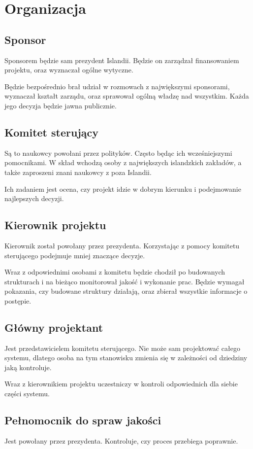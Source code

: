 \section{Organizacja} 
\subsection{Sponsor}
Sponsorem będzie sam prezydent Islandii.
Będzie on zarządzał finansowaniem projektu, oraz wyznaczał ogólne wytyczne.

Będzie bezpośrednio brał udział w rozmowach z największymi sponsorami, wyznaczał kształt zarządu, oraz sprawował ogólną władzę nad wszystkim.
Każda jego decyzja będzie jawna publicznie.

\subsection{Komitet sterujący}
Są to naukowcy powołani przez polityków. Często będąc ich wcześniejszymi pomocnikami.
W skład wchodzą osoby z największych islandzkich zakładów, a także zaproszeni znani naukowcy z poza Islandii.

Ich zadaniem jest ocena, czy projekt idzie w dobrym kierunku i podejmowanie najlepszych decyzji.

\subsection{Kierownik projektu}
Kierownik został powołany przez prezydenta.
Korzystając z pomocy komitetu sterującego podejmuje mniej znaczące decyzje.

Wraz z odpowiednimi osobami z komitetu będzie chodził po budowanych strukturach i na bieżąco monitorował jakość i wykonanie prac.
Będzie wymagał pokazania, czy budowane struktury działają, oraz zbierał wszystkie informacje o postępie.

\subsection{Główny projektant}
Jest przedstawicielem komitetu sterującego. Nie może sam projektować całego systemu, dlatego osoba na tym stanowisku zmienia się w zależności od dziedziny jaką kontroluje.

Wraz z kierownikiem projektu uczestniczy w kontroli odpowiednich dla siebie części systemu.

\subsection{Pełnomocnik do spraw jakości}
Jest powołany przez prezydenta. Kontroluje, czy proces przebiega poprawnie.

